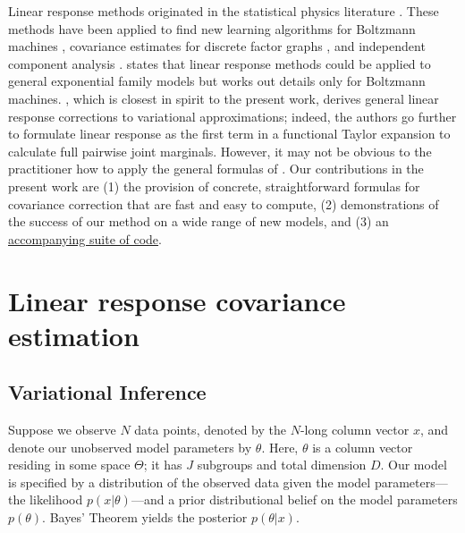 \documentclass{article}\usepackage[]{graphicx}\usepackage[]{color}
\begin{document}
Linear response methods originated in the statistical physics literature
\citep{opper:2001:advancedmeanfield, tanaka:2000:information,
kappen:1998:efficient, opper:2003:variational}. These methods have been applied
to find new learning algorithms for Boltzmann machines
\citep{kappen:1998:efficient}, covariance estimates for discrete factor graphs
\citep{welling:2004:linear}, and independent component analysis
\citep{hojen:2002:mean}. \citep{tanaka:1998:mean} states that linear response
methods could be applied to general exponential family models but works out
details only for Boltzmann machines. \citep{opper:2003:variational}, which is
closest in spirit to the present work, derives general linear response
corrections to variational approximations; indeed, the authors go further to
formulate linear response as the first term in a functional Taylor expansion to
calculate full pairwise joint marginals. However, it may not be obvious to the
practitioner how to apply the general formulas of \citep{opper:2003:variational}.
Our contributions in the present work are (1) the provision of concrete,
straightforward formulas for covariance correction that are fast and easy to
compute, (2) demonstrations of the success of our method on a wide range of new
models, and (3) an
\href{https://github.com/rgiordan/LinearResponseVariationalBayesNIPS2015}{accompanying suite of code}.

\section{Linear response covariance estimation} \label{sec:lr}

\subsection{Variational Inference}

Suppose we observe $N$ data points, denoted by the $N$-long column vector $x$,
and denote our unobserved model parameters by $\theta$. Here, $\theta$ is a
column vector residing in some space $\Theta$; it has $J$ subgroups and total
dimension $D$. Our model is specified by a distribution of the observed data
given the model parameters---the likelihood $p(x | \theta)$---and a prior
distributional belief on the model parameters $p(\theta)$. Bayes' Theorem yields
the posterior $p(\theta | x)$.
\end{document}
